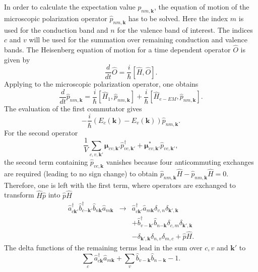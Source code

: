 In order to calculate the expectation value $p_{nm,\mathbf{k}}$,
the equation of motion of the microscopic polarization operator $\hat{p}_{nm,\mathbf{k}}$
 has to be solved. Here the index $m$ is used for the conduction
band and $n$ for the valence band of interest. The indices $c$ and
$v$ will be used for the summation over remaining conduction and
valence bands. The Heisenberg equation of motion for a time dependent
operator $\hat{O}$ is given by \citet{Chow}\begin{equation}
\frac{d}{dt}\hat{O}=\frac{i}{\hbar}\left[\hat{H},\hat{O}\right].\label{eq:Heisenberg_Eq_Motion}\end{equation}
Applying to the microscopic polarization operator, one obtains\begin{equation}
\frac{d}{dt}\hat{p}_{nm,\mathbf{k}}=\frac{i}{\hbar}\left[\hat{H}_{1},\hat{p}_{nm,\mathbf{k}}\right]+\frac{i}{\hbar}\left[\hat{H}_{e-EM},\hat{p}_{nm,\mathbf{k}}\right].\end{equation}
The evaluation of the first commutator gives\begin{equation}
-\frac{i}{\hbar}\left(E_{c}(\mathbf{k})-E_{v}(\mathbf{k})\right)\hat{p}_{nm,\mathbf{k}}.\end{equation}
For the second operator\begin{equation}
\frac{1}{V}\sum_{c,v,\mathbf{k}'}\boldsymbol{\mu}_{cv,\mathbf{k}'}\hat{p}_{vc,\mathbf{k}'}^{\dagger}+\boldsymbol{\mu}_{cv,\mathbf{k}'}^{*}\hat{p}_{vc,\mathbf{k}'},\end{equation}
the second term containing $\hat{p}_{vc,\mathbf{k}}$ vanishes because
four anticommuting exchanges are required (leading to no sign change)
to obtain $\hat{p}_{nm,\mathbf{k}}\hat{H}-\hat{p}_{nm,\mathbf{k}}\hat{H}=0$.
Therefore, one is left with the first term, where operators are exchanged
to transform $\hat{H}\hat{p}$ into $\hat{p}\hat{H}$\begin{eqnarray}
\hat{a}_{c\mathbf{k}'}^{\dagger}\hat{b}_{c\mathbf{-k}'}^{\dagger}\hat{b}_{n\mathbf{k}}\hat{a}_{m\mathbf{k}} & \rightarrow & \hat{a}_{c\mathbf{k}'}^{\dagger}\hat{a}_{m\mathbf{k}}\delta_{v,n}\delta_{\mathbf{k}',\mathbf{k}}\nonumber \\
 &  & +\hat{b}_{v-\mathbf{k}'}^{\dagger}\hat{b}_{n\mathbf{-k}}\delta_{c,m}\delta_{\mathbf{k}',\mathbf{k}}\\
 &  & -\delta_{\mathbf{k}',\mathbf{k}}\delta_{n,v}\delta_{m,c}+\hat{p}\hat{H}.\nonumber \end{eqnarray}
The delta functions of the remaining terms lead in the sum over $c,v$
and $\mathbf{k}'$ to\begin{equation}
\sum_{c}\hat{a}_{c\mathbf{k}}^{\dagger}\hat{a}_{m\mathbf{k}}+\sum_{v}\hat{b}_{v-\mathbf{k}}\hat{b}_{n-\mathbf{k}}-1.\end{equation}
